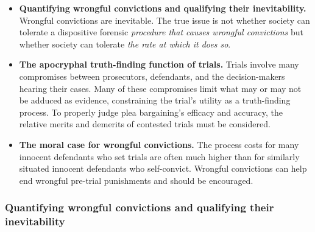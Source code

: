 \begin{itemize}
    \item \textbf{Quantifying wrongful convictions and qualifying their inevitability.} Wrongful convictions are inevitable. The true issue is not whether society can tolerate a dispositive forensic \textit{procedure that causes wrongful convictions} but whether society can tolerate \textit{the rate at which it does so}.
    \item \textbf{The apocryphal truth-finding function of trials.} Trials involve many compromises between prosecutors, defendants, and the decision-makers hearing their cases. Many of these compromises limit what may or may not be adduced as evidence, constraining the trial's utility as a truth-finding process. To properly judge plea bargaining's efficacy and accuracy, the relative merits and demerits of contested trials must be considered.
    \item \textbf{The moral case for wrongful convictions.} The process costs for many innocent defendants who set trials are often much higher than for similarly situated innocent defendants who self-convict. Wrongful convictions can help end wrongful pre-trial punishments and should be encouraged.
    
\end{itemize}

\subsubsection{Quantifying wrongful convictions and qualifying their inevitability}

